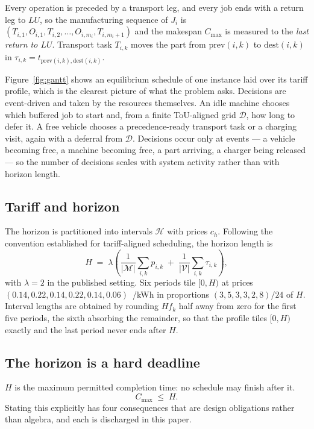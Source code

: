 \documentclass[preprint, 3p, review, 12pt]{elsarticle}
\providecommand{\euro}{\texteuro}
\theoremstyle{definition}
\begin{document}
Every operation is preceded by a transport leg, and every job ends with a return leg to
$LU$, so the manufacturing sequence of $J_i$ is
$(T_{i,1}, O_{i,1}, T_{i,2}, \dots, O_{i,m_i}, T_{i,m_i+1})$ and the makespan $C_{\max}$ is
measured to the \emph{last return to $LU$}. Transport task $T_{i,k}$ moves the part from
$\mathrm{prev}(i,k)$ to $\mathrm{dest}(i,k)$ in $\tau_{i,k}=t_{\mathrm{prev}(i,k),\mathrm{dest}(i,k)}$.

Figure~\ref{fig:gantt} shows an equilibrium schedule of one instance laid over its tariff
profile, which is the clearest picture of what the problem asks. Decisions are event-driven
and taken by the resources themselves. An idle machine chooses
which buffered job to start and, from a finite ToU-aligned grid $\mathcal{D}$, how long to
defer it. A free vehicle chooses a precedence-ready transport task or a charging visit,
again with a deferral from $\mathcal{D}$. Decisions occur only at events --- a vehicle
becoming free, a machine becoming free, a part arriving, a charger being released --- so the
number of decisions scales with system activity rather than with horizon length.

\subsection{Tariff and horizon}
The horizon is partitioned into intervals $\mathcal{H}$ with prices $c_h$. Following the
convention established for tariff-aligned scheduling, the horizon length is
\begin{equation}
H \;=\; \lambda\left(\frac{1}{|\mathcal{M}|}\sum_{i,k} p_{i,k}
        \;+\; \frac{1}{|\mathcal{V}|}\sum_{i,k}\tau_{i,k}\right),
\label{eq:horizon}
\end{equation}
with $\lambda=2$ in the published setting. Six periods tile $[0,H)$ at prices
$(0.14, 0.22, 0.14, 0.22, 0.14, 0.06)$~\euro/kWh in proportions $(3,5,3,3,2,8)/24$ of $H$.
Interval lengths are obtained by rounding $H f_k$ half away from zero for the first five
periods, the sixth absorbing the remainder, so that the profile tiles $[0,H)$ exactly and
the last period never ends after $H$.

\subsection{The horizon is a hard deadline}
\label{sec:deadline}
$H$ is the maximum permitted completion time: no schedule may finish after it.
\begin{equation}
C_{\max} \;\le\; H .
\label{eq:deadline}
\end{equation}
Stating this explicitly has four consequences that are design obligations rather than
algebra, and each is discharged in this paper.
\end{document}
